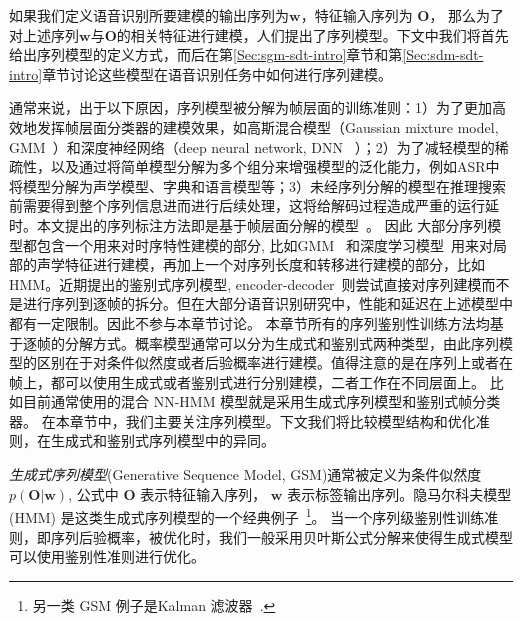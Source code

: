 如果我们定义语音识别所要建模的输出序列为$\mathbf w$，特征输入序列为 ${\mathbf O}$，
那么为了对上述序列$\mathbf w$与${\mathbf O}$的相关特征进行建模，人们提出了序列模型。下文中我们将首先给出序列模型的定义方式，而后在第\ref{Sec:sgm-sdt-intro}章节和第\ref{Sec:sdm-sdt-intro}章节讨论这些模型在语音识别任务中如何进行序列建模。

通常来说，出于以下原因，序列模型被分解为帧层面的训练准则：1）为了更加高效地发挥帧层面分类器的建模效果，如高斯混合模型（Gaussian mixture model, GMM~\cite{woodland1994large}）和深度神经网络（deep neural network, DNN ~\cite{hinton2012deep}）；2）为了减轻模型的稀疏性，以及通过将简单模型分解为多个组分来增强模型的泛化能力，例如ASR中将模型分解为声学模型、字典和语言模型等；3）未经序列分解的模型在推理搜索前需要得到整个序列信息进而进行后续处理，这将给解码过程造成严重的运行延时。本文提出的序列标注方法即是基于帧层面分解的模型~\cite{forney1973viterbi,mohri2002weighted}。
因此
大部分序列模型都包含一个用来对时序特性建模的部分, 比如GMM~\cite{woodland1994large} 和深度学习模型~\cite{hinton2012deep}用来对局部的声学特征进行建模，再加上一个对序列长度和转移进行建模的部分，比如HMM。近期提出的鉴别式序列模型, encoder-decoder~\cite{chan2016end}则尝试直接对序列建模而不是进行序列到逐帧的拆分。但在大部分语音识别研究中，性能和延迟在上述模型中都有一定限制。因此不参与本章节讨论。
本章节所有的序列鉴别性训练方法均基于逐帧的分解方式。概率模型通常可以分为生成式和鉴别式两种类型，由此序列模型的区别在于对条件似然度或者后验概率进行建模。值得注意的是在序列上或者在帧上，都可以使用生成式或者鉴别式进行分别建模，二者工作在不同层面上。
比如目前通常使用的混合 NN-HMM 模型就是采用生成式序列模型和鉴别式帧分类器。
在本章节中，我们主要关注序列模型。下文我们将比较模型结构和优化准则，在生成式和鉴别式序列模型中的异同。


{\em 生成式序列模型}(Generative Sequence Model, GSM)通常被定义为条件似然度$p(\mathbf{O}|\mathbf{w})$, 公式中 ${\mathbf O}$ 表示特征输入序列， $\mathbf w$ 表示标签输出序列。隐马尔科夫模型 (HMM) 是这类生成式序列模型的一个经典例子~\footnote{另一类 GSM 例子是Kalman 滤波器~\cite{digalakis1991dynamical,abbeel2005discriminative}.}。
%
当一个序列级鉴别性训练准则，即序列后验概率，被优化时，我们一般采用贝叶斯公式分解来使得生成式模型可以使用鉴别性准则进行优化。




